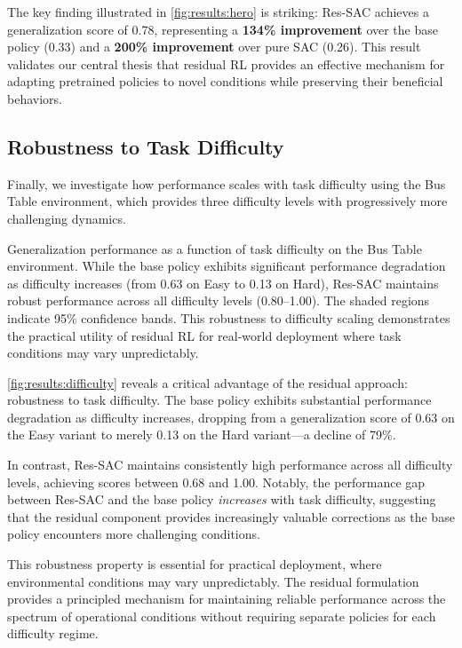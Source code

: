 The key finding illustrated in \autoref{fig:results:hero} is striking: Res-SAC achieves a generalization score of 0.78, representing a \textbf{134\% improvement} over the base policy (0.33) and a \textbf{200\% improvement} over pure SAC (0.26). This result validates our central thesis that residual \ac{RL} provides an effective mechanism for adapting pretrained policies to novel conditions while preserving their beneficial behaviors.

\subsection{Robustness to Task Difficulty}
\label{sec:results:difficulty}

Finally, we investigate how performance scales with task difficulty using the Bus Table environment, which provides three difficulty levels with progressively more challenging dynamics.

{Generalization performance as a function of task difficulty on the Bus Table environment. While the base policy exhibits significant performance degradation as difficulty increases (from 0.63 on Easy to 0.13 on Hard), Res-SAC maintains robust performance across all difficulty levels (0.80--1.00). The shaded regions indicate 95\% confidence bands. This robustness to difficulty scaling demonstrates the practical utility of residual \ac{RL} for real-world deployment where task conditions may vary unpredictably.}

\autoref{fig:results:difficulty} reveals a critical advantage of the residual approach: robustness to task difficulty. The base policy exhibits substantial performance degradation as difficulty increases, dropping from a generalization score of 0.63 on the Easy variant to merely 0.13 on the Hard variant---a decline of 79\%.

In contrast, Res-SAC maintains consistently high performance across all difficulty levels, achieving scores between 0.68 and 1.00. Notably, the performance gap between Res-SAC and the base policy \emph{increases} with task difficulty, suggesting that the residual component provides increasingly valuable corrections as the base policy encounters more challenging conditions.

This robustness property is essential for practical deployment, where environmental conditions may vary unpredictably. The residual formulation provides a principled mechanism for maintaining reliable performance across the spectrum of operational conditions without requiring separate policies for each difficulty regime.


